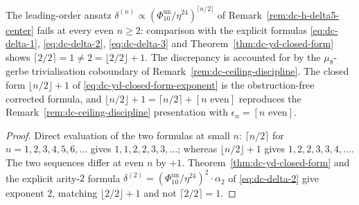 \begin{corollary}
\label{cor:dc-yd-lceil-obstruction}
The leading-order ansatz
$\delta^{(n)} \propto (\Phi_{10}^{\mathrm{un}}/\eta^{24})^{\lceil n/2\rceil}$ of
Remark~\ref{rem:dc-h-delta5-center} fails at every even
$n \geq 2$: comparison with the explicit formulas
\eqref{eq:dc-delta-1}, \eqref{eq:dc-delta-2}, \eqref{eq:dc-delta-3}
and Theorem~\ref{thm:dc-yd-closed-form} shows
$\lceil 2/2\rceil = 1 \neq 2 = \lfloor 2/2\rfloor + 1$. The discrepancy
is accounted for by the $\mu_8$-gerbe trivialisation coboundary of
Remark~\ref{rem:dc-ceiling-discipline}. The closed form
$\lfloor n/2\rfloor + 1$ of \eqref{eq:dc-yd-closed-form-exponent} is
the obstruction-free corrected formula, and
$\lfloor n/2\rfloor + 1 = \lceil n/2\rceil + [n \text{ even}]$ reproduces
the Remark~\ref{rem:dc-ceiling-discipline} presentation with
$\epsilon_n = [n \text{ even}]$.
\end{corollary}

\begin{proof}
Direct evaluation of the two formulas at small $n$: $\lceil n/2\rceil$
for $n = 1,2,3,4,5,6,\ldots$ gives $1,1,2,2,3,3,\ldots$; whereas
$\lfloor n/2\rfloor + 1$ gives $1,2,2,3,3,4,\ldots$. The two sequences
differ at even $n$ by $+1$. Theorem~\ref{thm:dc-yd-closed-form} and
the explicit arity-$2$ formula $\delta^{(2)} = (\Phi_{10}^{\mathrm{un}}/\eta^{24})^2
\cdot\alpha_2$ of \eqref{eq:dc-delta-2} give exponent $2$, matching
$\lfloor 2/2\rfloor + 1$ and not $\lceil 2/2\rceil = 1$.
\end{proof}

